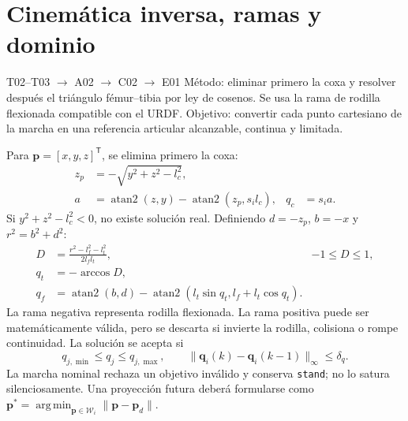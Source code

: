 \documentclass[11pt,letterpaper]{article}
\newcommand{\vect}[1]{\bm{#1}}
\newcommand{\trans}{^{\mathsf T}}
\newcommand{\argmin}{\operatorname*{arg\,min}}
\begin{document}
\section{Cinemática inversa, ramas y dominio}
\begin{tracebox}{T02--T03 $\rightarrow$ A02 $\rightarrow$ C02 $\rightarrow$ E01}
Método: eliminar primero la coxa y resolver después el triángulo fémur--tibia
por ley de cosenos. Se usa la rama de rodilla flexionada compatible con el URDF.
Objetivo: convertir cada punto cartesiano de la marcha en una referencia articular
alcanzable, continua y limitada.
\end{tracebox}
Para $\vect p=[x,y,z]\trans$, se elimina primero la coxa:
\begin{align}
 z_p&=-\sqrt{y^2+z^2-l_c^2},\label{eq:ikzp}\\
 a&=\operatorname{atan2}(z,y)-\operatorname{atan2}(z_p,s_il_c),
 &q_c&=s_i a.\label{eq:ikcoxa}
\end{align}
Si $y^2+z^2-l_c^2<0$, no existe solución real. Definiendo $d=-z_p$,
$b=-x$ y $r^2=b^2+d^2$:
\begin{align}
 D&=\frac{r^2-l_f^2-l_t^2}{2l_fl_t}, & -1\le D\le1,\label{eq:D}\\
 q_t&=-\arccos D,\label{eq:kneebranch}\\
 q_f&=\operatorname{atan2}(b,d)-
 \operatorname{atan2}\!\left(l_t\sin q_t,l_f+l_t\cos q_t\right).\label{eq:ikfemur}
\end{align}
La rama negativa representa rodilla flexionada. La rama positiva puede ser
matemáticamente válida, pero se descarta si invierte la rodilla, colisiona o
rompe continuidad. La solución se acepta si
\begin{equation}
 q_{j,\min}\le q_j\le q_{j,\max},\qquad
 \|\vect q_i(k)-\vect q_i(k-1)\|_\infty\le\delta_q.\label{eq:iklimits}
\end{equation}
La marcha nominal rechaza un objetivo inválido y conserva \texttt{stand}; no
lo satura silenciosamente. Una proyección futura deberá formularse como
$\vect p^*=\argmin_{\vect p\in\mathcal W_i}\|\vect p-\vect p_d\|$.
\end{document}
